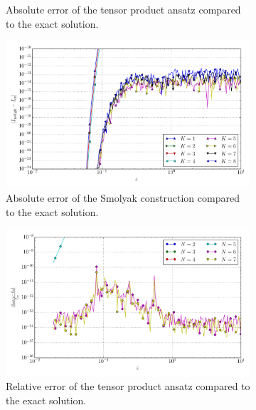 \documentclass[a4paper,10pt]{article}
\begin{document}
\begin{figure}[ht!]
\begin{subfigure}[t]{0.5\linewidth}
    \caption{Absolute error of the tensor product ansatz compared to the exact solution.}
    \label{fig:tp_sg_6d_conv_eps_500000_500000_err_nsd_tp}
  \end{subfigure}
  \begin{subfigure}[t]{0.5\linewidth}
    \includegraphics[width=\linewidth]{./plots/tp_sg_6d_conv_eps_(5,0,0,0,0,0)_(5,0,0,0,0,0)_err_nsd_gk.pdf}
    \caption{Absolute error of the Smolyak construction compared to the exact solution.}
    \label{fig:tp_sg_6d_conv_eps_500000_500000_err_nsd_gk}
  \end{subfigure}
  \begin{subfigure}[t]{0.5\linewidth}
    \includegraphics[width=\linewidth]{./plots/tp_sg_6d_conv_eps_(5,0,0,0,0,0)_(5,0,0,0,0,0)_err_rel_nsd_tp.pdf}
    \caption{Relative error of the tensor product ansatz compared to the exact solution.}
    \label{fig:tp_sg_6d_conv_eps_500000_500000_err_rel_nsd_tp}
  \end{subfigure}
  \begin{subfigure}[t]{0.5\linewidth}

\end{subfigure}
\end{figure}
\end{document}
